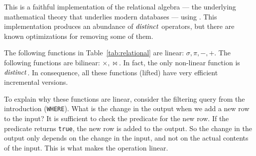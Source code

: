 %
%
%
%
%
%

This is a faithful implementation of the relational algebra --- the
underlying mathematical theory that underlies modern databases ---
using \zrs.  This implementation produces an abundance of $\mathit{distinct}$
operators, but there are known optimizations for removing some of
them.

The following functions in Table~\ref{tab:relational} are linear:
$\sigma, \pi, -, +$.  The following functions are bilinear: $\times,
\bowtie$.  In fact, the only non-linear function is $\mathit{distinct}$.  In
consequence, all these functions (lifted) have very efficient
incremental versions.

To explain why these functions are linear, consider the filtering
query from the introduction (\texttt{WHERE}).  What is the change in
the output when we add a new row to the input?  It is sufficient to
check the predicate for the new row.  If the predicate returns
\texttt{true}, the new row is added to the output.  So the change in
the output only depends on the change in the input, and not on the
actual contents of the input.  This is what makes the operation
linear.


